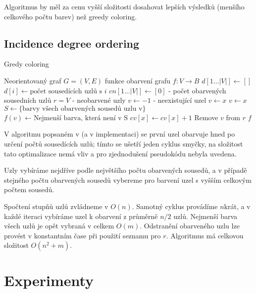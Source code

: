 \documentclass[12pt, a4paper]{article}
\begin{document}
Algoritmus by měl za cenu vyšší složitosti dosahovat lepších výsledků (menšího celkového počtu barev) než greedy coloring.

\subsection{Incidence degree ordering}
\begin{algorithm}
\caption{Gredy coloring} %
\label{Greedy coloring}
\begin{algorithmic}
\Input Neorientovaný graf $G = (V, E)$
\Output funkce obarvení grafu $f: 	V \rightarrow B$
\State $d[1 \dots |V|] \leftarrow []$
	\State $d[i] \leftarrow \text{počet sousedících uzlů s }i$
\EndFor
\State $cn[1 \dots |V|] \leftarrow [0]$ - počet obarvených sousedních uzlů
\State $r = V$ - neobarvené uzly
	\State $v \leftarrow -1$ - neexistující uzel
			\State $v \leftarrow x$
		\EndIf
			\State $v \leftarrow x$
		\EndIf
	\EndFor
	\State $S \leftarrow \{ \text{barvy všech obarvených sousedů uzlu v} \}$
	\State $f(v) \leftarrow \text{Nejmenší barva, která není v S}$
		\State $cv[x] \leftarrow cv[x] + 1$
	\EndFor
	\State Remove $v$ from $r$
\EndWhile
\State \Return $f$
\end{algorithmic}
\end{algorithm}

V algoritmu popsaném v \cite{ar4} (a v implementaci) se první uzel obarvuje hned po určení počtů sousedících uzlů; tímto se ušetří jeden cyklus smyčky,
na složitost tato optimalizace nemá vliv a pro zjednodušení pseudokódu nebyla uvedena.

Uzly vybíráme nejdříve podle největšího počtu obarvených sousedů, a v případě stejného počtu obarvených sousedů vybereme pro barvení uzel s vyšším celkovým počtem sousedů.

Spočtení stupňů uzlů zvládneme v $O(n)$.
Samotný cyklus provádíme $n$krát, a v každé iteraci vybíráme uzel k obarvení z průměrně $n / 2$ uzlů.
Nejmenší barva všech uzlů je opět vybraná v celkem $O(m)$.
Odstranění obarveného uzlu lze provést v konstantním čase při použití seznamu pro $r$.
Algoritmus má celkovou složitost $O(n^2 + m)$.

\section{Experimenty}
\end{document}
